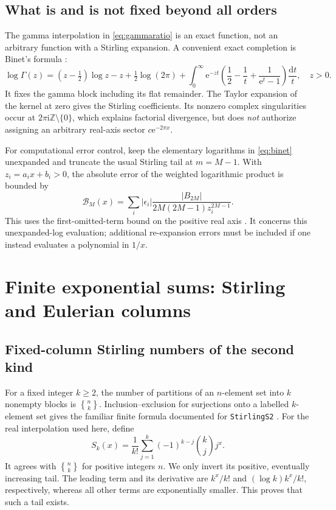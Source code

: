 \documentclass[11pt,a4paper]{article}
\theoremstyle{definition}
\theoremstyle{remark}
\newcommand{\dd}{\mathrm d}
\newcommand{\ee}{\mathrm e}
\newcommand{\ii}{\mathrm i}
\newcommand{\Sii}[2]{\genfrac{\{}{\}}{0pt}{}{#1}{#2}}
\numberwithin{equation}{section}
\begin{document}
\subsection{What is and is not fixed beyond all orders}
\label{subsec:binet}
The gamma interpolation in \eqref{eq:gammaratio} is an exact function, not an arbitrary function with a Stirling expansion. A convenient exact completion is Binet's formula \cite{dlmfbinet}:
\begin{equation}
 \log\Gamma(z)=(z-\tfrac12)\log z-z+\tfrac12\log(2\pi)
 +\int_0^\infty\ee^{-zt}
 \left(\frac12-\frac1t+\frac1{\ee^t-1}\right)\frac{\dd t}{t},
 \quad z>0.
 \label{eq:binet}
\end{equation}
It fixes the gamma block including its flat remainder. The Taylor expansion of the kernel at zero gives the Stirling coefficients. Its nonzero complex singularities occur at $2\pi\ii\mathbb Z\setminus\{0\}$, which explains factorial divergence, but does \emph{not} authorize assigning an arbitrary real-axis sector $c\ee^{-2\pi x}$.

For computational error control, keep the elementary logarithms in \eqref{eq:binet} unexpanded and truncate the usual Stirling tail at $m=M-1$. With $z_i=a_ix+b_i>0$, the absolute error of the weighted logarithmic product is bounded by
\begin{equation}
 \mathcal B_M(x)=\sum_i|\epsilon_i|
 \frac{|B_{2M}|}{2M(2M-1)z_i^{2M-1}}.
 \label{eq:binetbound}
\end{equation}
This uses the first-omitted-term bound on the positive real axis \cite{dlmfgamma}. It concerns this unexpanded-log evaluation; additional re-expansion errors must be included if one instead evaluates a polynomial in $1/x$.

\section{Finite exponential sums: Stirling and Eulerian columns}
\label{sec:finite}

\subsection{Fixed-column Stirling numbers of the second kind}
For a fixed integer $k\ge2$, the number of partitions of an $n$-element set into $k$ nonempty blocks is $\Sii nk$. Inclusion--exclusion for surjections onto a labelled $k$-element set gives the familiar finite formula documented for \texttt{StirlingS2} \cite{wlstirling}. For the real interpolation used here, define
\begin{equation}
 S_k(x)=\frac1{k!}\sum_{j=1}^k(-1)^{k-j}\binom kj j^x.
 \label{eq:stirlinginterp}
\end{equation}
It agrees with $\Sii nk$ for positive integers $n$. We only invert its positive, eventually increasing tail. The leading term and its derivative are $k^x/k!$ and $(\log k)k^x/k!$, respectively, whereas all other terms are exponentially smaller. This proves that such a tail exists.
\end{document}
